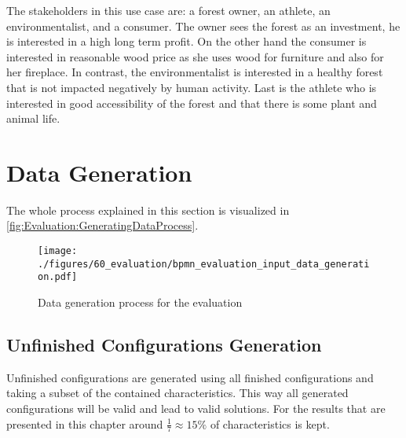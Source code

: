 The stakeholders in this use case are: a forest owner, an athlete, an environmentalist, and a consumer. The owner sees the forest as an investment, he is interested in a high long term profit. On the other hand the consumer is interested in reasonable wood price as she uses wood for furniture and also for her fireplace. In contrast, the environmentalist is interested in a healthy forest that is not impacted negatively by human activity. Last is the athlete who is interested in good accessibility of the forest and that there is some plant and animal life.


\section{Data Generation}
\label{sec:Evaluation:GeneratingGroups}


The whole process explained in  this section is visualized in \autoref{fig:Evaluation:GeneratingDataProcess}.

\begin{figure}
    \centering
    \texttt{[image: ./figures/60\_evaluation/bpmn\_evaluation\_input\_data\_generation.pdf]}
    \caption{Data generation process for the evaluation}
    \label{fig:Evaluation:GeneratingDataProcess}
\end{figure}

\subsection{Unfinished Configurations Generation}

Unfinished configurations are generated using all finished configurations and taking a subset of the contained characteristics. This way all generated configurations will be valid and lead to valid solutions. For the results that are presented in this chapter around $\frac{1}{7} \approx 15\%$  of characteristics is kept.

